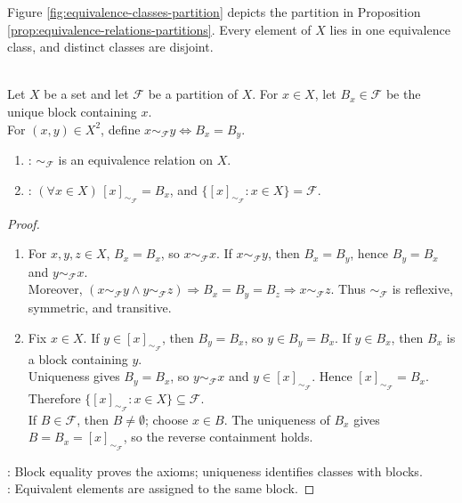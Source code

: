 Figure \ref{fig:equivalence-classes-partition} depicts the partition in Proposition \ref{prop:equivalence-relations-partitions}. Every element of $X$ lies in one equivalence class, and distinct classes are disjoint.

\begin{proposition} \label{prop:partitions-determine-equivalence-relations} \\
Let $X$ be a set and let $\mathcal{F}$ be a partition of $X$. For $x\in X$, let $B_x\in\mathcal{F}$ be the unique block containing $x$.\\
For $(x,y)\in X^2$, define $x\sim_{\mathcal{F}}y\Longleftrightarrow B_x=B_y$.
\begin{enumerate}[label=(\roman*)]
\setlength{\itemsep}{0pt}
\item {}: $\sim_{\mathcal{F}}$ is an equivalence relation on $X$.
\item {}: $(\forall x\in X)\,[x]_{\sim_{\mathcal{F}}}=B_x$, and $\{[x]_{\sim_{\mathcal{F}}}:x\in X\}=\mathcal{F}$.
\end{enumerate}
\begin{proof}
\begin{enumerate}[label=(\roman*)]
\setlength{\itemsep}{0pt}
\item For $x,y,z\in X$, $B_x=B_x$, so $x\sim_{\mathcal{F}}x$. If $x\sim_{\mathcal{F}}y$, then $B_x=B_y$, hence $B_y=B_x$ and $y\sim_{\mathcal{F}}x$.\\
Moreover, $(x\sim_{\mathcal{F}}y\land y\sim_{\mathcal{F}}z)\Rightarrow B_x=B_y=B_z\Rightarrow x\sim_{\mathcal{F}}z$. Thus $\sim_{\mathcal{F}}$ is reflexive, symmetric, and transitive.
\item Fix $x\in X$. If $y\in[x]_{\sim_{\mathcal{F}}}$, then $B_y=B_x$, so $y\in B_y=B_x$. If $y\in B_x$, then $B_x$ is a block containing $y$.\\
Uniqueness gives $B_y=B_x$, so $y\sim_{\mathcal{F}}x$ and $y\in[x]_{\sim_{\mathcal{F}}}$. Hence $[x]_{\sim_{\mathcal{F}}}=B_x$. Therefore $\{[x]_{\sim_{\mathcal{F}}}:x\in X\}\subseteq\mathcal{F}$.\\
If $B\in\mathcal{F}$, then $B\neq\emptyset$; choose $x\in B$. The uniqueness of $B_x$ gives $B=B_x=[x]_{\sim_{\mathcal{F}}}$, so the reverse containment holds.
\end{enumerate}
: Block equality proves the axioms; uniqueness identifies classes with blocks.\\
: Equivalent elements are assigned to the same block.
\end{proof}
\end{proposition}

